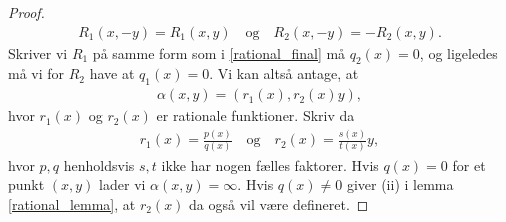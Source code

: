 \begin{proof}
\begin{align*}
	R_1(x, -y) = R_1(x, y) \quad \text{og} \quad R_2(x, -y) = -R_2(x, y).
\end{align*}
Skriver vi $R_1$ på samme form som i \eqref{rational_final} må $q_2(x) = 0$, og ligeledes må vi for $R_2$ have at $q_1(x) = 0$. Vi kan altså antage, at
\begin{align*}
		\alpha(x, y) = (r_1(x), r_2(x)y),
\end{align*}
hvor $r_1(x)$ og $r_2(x)$ er rationale funktioner. Skriv da
\begin{align*}
	r_1(x) = \frac{p(x)}{q(x)} \quad \text{og} \quad r_2(x)=\frac{s(x)}{t(x)}y,
\end{align*}
hvor $p, q$ henholdsvis $s, t$ ikke har nogen fælles faktorer. Hvis $q(x)=0$ for et punkt $(x, y)$ lader vi 
$\alpha(x, y) = \infty$. Hvis $q(x) \neq 0$ giver (ii) i lemma \ref{rational_lemma}, at $r_2(x)$ da også vil være defineret.
\end{proof}

